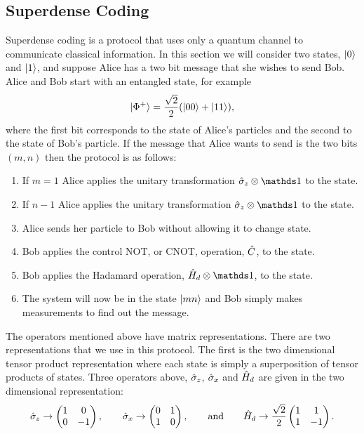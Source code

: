     \subsection{Superdense Coding}
    Superdense coding is a protocol that uses only a quantum channel to communicate classical information.
    In this section we will consider two states, \(\vert {0} \rangle\) and \(\vert {1} \rangle\), and suppose Alice has a two bit message that she wishes to send Bob.
    Alice and Bob start with an entangled state, for example
    \[\vert {\Phi^+} \rangle = \frac{\sqrt{2}}{2}(\vert {00} \rangle + \vert {11} \rangle),\]
    where the first bit corresponds to the state of Alice's particles and the second to the state of Bob's particle.
    If the message that Alice wants to send is the two bits \((m, n)\) then the protocol is as follows:
    \begin{enumerate}
        \item If \(m = 1\) Alice applies the unitary transformation \(\operator{\sigma}_z\tensorProd\ident\) to the state.
        \item If \(n - 1\) Alice applies the unitary transformation \(\operator{\sigma}_z\tensorProd\ident\) to the state.
        \item Alice sends her particle to Bob without allowing it to change state.
        \item Bob applies the control NOT, or CNOT, operation, \(\hat{C}\), to the state.
        \item Bob applies the Hadamard operation, \(\operator{H}_d\tensorProd\ident\), to the state.
        \item The system will now be in the state \(\vert {mn} \rangle\) and Bob simply makes measurements to find out the message.
    \end{enumerate}
    The operators mentioned above have matrix representations.
    There are two representations that we use in this protocol.
    The first is the two dimensional tensor product representation where each state is simply a superposition of tensor products of states.
    Three operators above, \(\hat{\sigma}_z\), \(\hat{\sigma}_x\) and \(\hat{H}_d\) are given in the two dimensional representation:
    \[
        \hat{\sigma}_z \mathrel{\rightarrow}
        \begin{pmatrix}
            1 & 0\\
            0 & -1
        \end{pmatrix}
        , \qquad \hat{\sigma}_x \mathrel{\rightarrow}
        \begin{pmatrix}
            0 & 1\\
            1 & 0
        \end{pmatrix}
        , \qquad\text{and}\qquad \hat{H}_d \mathrel{\rightarrow} \frac{\sqrt{2}}{2}
        \begin{pmatrix}
            1 & 1\\
            1 & -1
        \end{pmatrix}
        .
    \]
